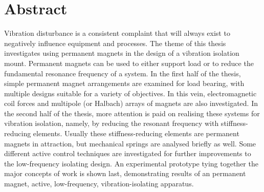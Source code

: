 
\section{Abstract}

Vibration disturbance is a consistent complaint that will always exist to
negatively influence equipment and processes. The theme of this thesis
investigates using permanent magnets in the design of a vibration isolation
mount. Permanent magnets can be used to either support load or to reduce the
fundamental resonance frequency of a system. In the first half of the thesis,
simple permanent magnet arrangements are examined for load bearing, with
multiple designs suitable for a variety of objectives. In this vein,
electromagnetic coil forces and multipole (or Halbach) arrays of magnets are
also investigated. In the second half of the thesis, more attention is paid on
realising these systems for vibration isolation, namely, by reducing the
resonant frequency with stiffness-reducing elements. Usually these
stiffness-reducing elements are permanent magnets in attraction, but
mechanical springs are analysed briefly as well. Some different active control
techniques are investigated for further improvements to the low-frequency
isolating design. An experimental prototype tying together the major concepts
of work is shown last, demonstrating results of an permanent magnet, active,
low-frequency, vibration-isolating apparatus.
